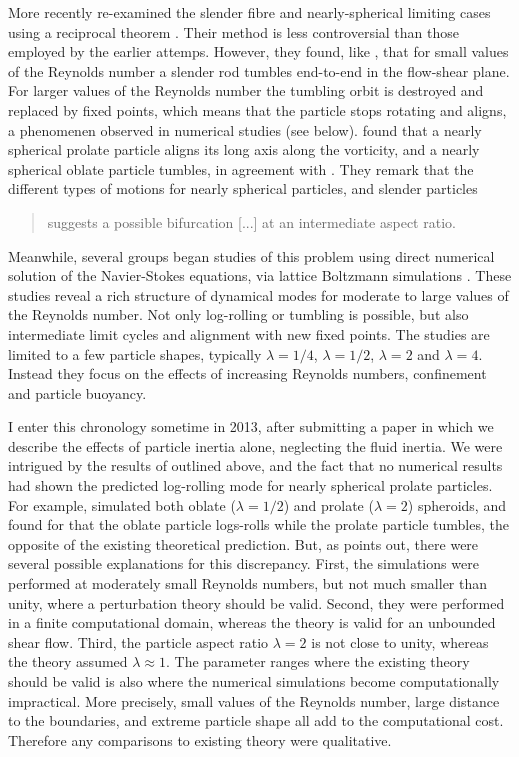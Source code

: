 \documentclass[thesis.tex]{subfiles}
\begin{document}
More recently \citet{subramanian2005,subramanian2006} re-examined the slender fibre and nearly-spherical limiting cases using a reciprocal theorem \cite{kim1991,lovalenti1993}. Their method is less controversial than those employed by the earlier attemps. However, they found, like \citet{harper1968}, that for small values of the Reynolds number a slender rod tumbles end-to-end in the flow-shear plane. For larger values of the Reynolds number the tumbling orbit is destroyed and replaced by fixed points, which means that the particle stops rotating and aligns, a phenomenen observed in numerical studies \cite{ding2000} (see below). \citet{subramanian2006} found that a nearly spherical prolate particle aligns its long axis along the vorticity, and a nearly spherical oblate particle tumbles, in agreement with \citet{saffman1956}. They remark that the different types of motions for nearly spherical particles, and slender particles \blockquote{suggests a possible bifurcation [...] at an intermediate aspect ratio.}

Meanwhile, several groups began studies of this problem using direct numerical solution of the Navier-Stokes equations, via lattice Boltzmann simulations \cite{feng1995,ding2000,qi2003,yu2007,huang2012,rosen2014,mao2014,rosen2015a,rosen2015b}. These studies reveal a rich structure of dynamical modes for moderate to large values of the Reynolds number. Not only log-rolling or tumbling is possible, but also intermediate limit cycles and alignment with new fixed points. The studies are limited to a few particle shapes, typically $\lambda=1/4$, $\lambda=1/2$, $\lambda=2$ and $\lambda=4$. Instead they focus on the effects of increasing Reynolds numbers, confinement and particle buoyancy.

I enter this chronology sometime in 2013, after submitting a paper \cite{einarsson2014} in which we describe the effects of particle inertia alone, neglecting the fluid inertia. We were intrigued by the results of \citet{subramanian2006,subramanian2006} outlined above, and the fact that no numerical results had shown the predicted log-rolling mode for nearly spherical prolate particles. For example, \citet{qi2003} simulated both oblate ($\lambda=1/2$) and prolate ($\lambda=2$) spheroids, and found for that the oblate particle logs-rolls while the prolate particle tumbles, the opposite of the existing theoretical prediction. But, as \citet{subramanian2006} points out, there were several possible explanations for this discrepancy. First, the simulations were performed at moderately small Reynolds numbers, but not much smaller than unity, where a perturbation theory should be valid. Second, they were performed in a finite computational domain, whereas the theory is valid for an unbounded shear flow. Third, the particle aspect ratio $\lambda=2$ is not close to unity, whereas the theory assumed $\lambda\approx1$. The parameter ranges where the existing theory should be valid is also where the numerical simulations become computationally impractical. More precisely, small values of the Reynolds number, large distance to the boundaries, and extreme particle shape all add to the computational cost. Therefore any comparisons to existing theory were qualitative.
\end{document}
